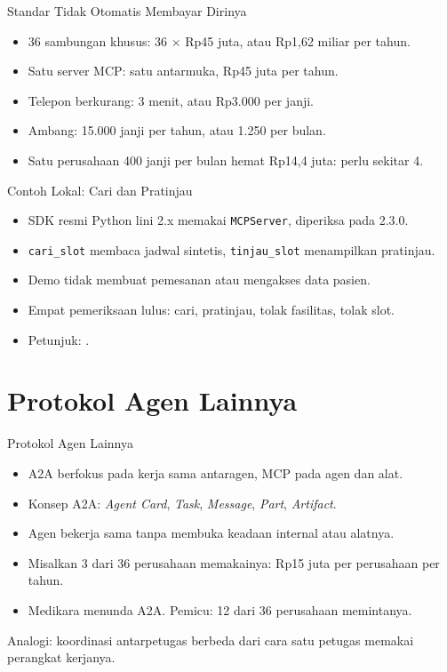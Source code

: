 \documentclass[aspectratio=169, table, 12pt]{beamer}
\begin{document}
\begin{frame}{{\Large Standar Tidak Otomatis Membayar Dirinya}}
  \vspace{8pt}
  \begin{itemize}
    \item 36 sambungan khusus: 36 $\times$ Rp45 juta, atau Rp1,62 miliar per tahun.
    \item Satu server MCP: satu antarmuka, Rp45 juta per tahun.
    \item Telepon berkurang: 3 menit, atau Rp3.000 per janji.
    \item Ambang: 15.000 janji per tahun, atau 1.250 per bulan.
    \item Satu perusahaan 400 janji per bulan hemat Rp14,4 juta: perlu sekitar 4.
  \end{itemize}
\end{frame}

\begin{frame}{{\Large Contoh Lokal: Cari dan Pratinjau}}
  \vspace{8pt}
  \begin{itemize}
    \item SDK resmi Python lini 2.x memakai \texttt{MCPServer}, diperiksa pada 2.3.0.
    \item \texttt{cari\_slot} membaca jadwal sintetis, \texttt{tinjau\_slot} menampilkan pratinjau.
    \item Demo tidak membuat pemesanan atau mengakses data pasien.
    \item Empat pemeriksaan lulus: cari, pratinjau, tolak fasilitas, tolak slot.
    \item Petunjuk: .
  \end{itemize}
\end{frame}

\section{Protokol Agen Lainnya}

\begin{frame}{{\Large Protokol Agen Lainnya}}
  \vspace{8pt}
  \begin{itemize}
    \item A2A berfokus pada kerja sama antaragen, MCP pada agen dan alat.
    \item Konsep A2A: \textit{Agent Card}, \textit{Task}, \textit{Message}, \textit{Part}, \textit{Artifact}.
    \item Agen bekerja sama tanpa membuka keadaan internal atau alatnya.
    \item Misalkan 3 dari 36 perusahaan memakainya: Rp15 juta per perusahaan per tahun.
    \item Medikara menunda A2A. Pemicu: 12 dari 36 perusahaan memintanya.
  \end{itemize}
  \vspace{6pt}
  {\small Analogi: koordinasi antarpetugas berbeda dari cara satu petugas memakai perangkat kerjanya.}
\end{frame}
\end{document}
